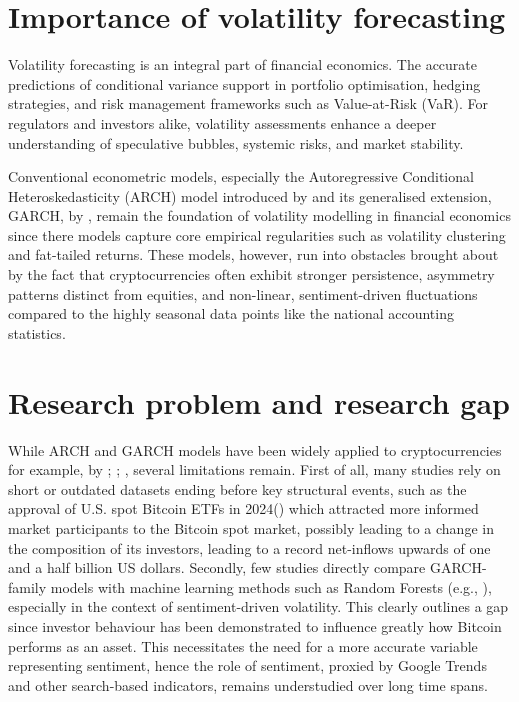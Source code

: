 \documentclass[12pt]{report}
\begin{document}
\section{Importance of volatility forecasting}

Volatility forecasting is an integral part of financial economics. The accurate predictions of conditional variance support in portfolio optimisation, hedging strategies, and risk management frameworks such as Value-at-Risk (VaR). For regulators and investors alike, volatility assessments enhance a deeper understanding of speculative bubbles, systemic risks, and market stability.

Conventional econometric models, especially the Autoregressive Conditional Heteroskedasticity (ARCH) model introduced by \cite{engle1982arch} and its generalised extension, GARCH, by \cite{bollerslev1986garch}, remain the foundation of volatility modelling in financial economics since there models capture core empirical regularities such as volatility clustering and fat-tailed returns. These models, however, run into obstacles brought about by the fact that cryptocurrencies often exhibit stronger persistence, asymmetry patterns distinct from equities, and non-linear, sentiment-driven fluctuations compared to the highly seasonal data points like the national accounting statistics.

\section{Research problem and research gap}

While ARCH and GARCH models have been widely applied to cryptocurrencies for example, by \cite{dyhrberg2016bitcoin}; \cite{chu2017garchcrypto}; \cite{katsiampa2017volatility}, several limitations remain. First of all, many studies rely on short or outdated datasets ending before key structural events, such as the approval of U.S. spot Bitcoin ETFs in 2024(\cite{Gensler2024SpotBitcoin}) which attracted more informed market participants to the Bitcoin spot market, possibly leading to a change in the composition of its investors, leading to a record net-inflows upwards of one and a half billion US dollars\citep{Babalos2025BitcoinETFs}. Secondly, few studies directly compare GARCH-family models with machine learning methods such as Random Forests (e.g., \cite{basher2022bitcoinRF}), especially in the context of sentiment-driven volatility. This clearly outlines a gap since investor behaviour has been demonstrated to influence greatly how Bitcoin performs as an asset\citep{katsiampa2017volatility}. This necessitates the need for a more accurate variable representing sentiment, hence the role of sentiment, proxied by Google Trends and other search-based indicators, remains understudied over long time spans. 
\end{document}
